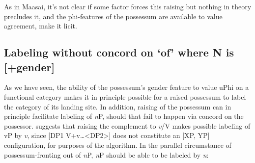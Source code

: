 \documentclass[output=paper
,modfonts
,nonflat]{langsci/langscibook}
\begin{document}
\begin{figure}[!h]
	\begin{exe}
	\end{exe}
\end{figure}
\newpage\noindent As in Maasai, it’s not clear if some factor forces this raising but nothing in theory precludes it, and the phi-features of the possessum are available to value agreement, make it licit.

\subsection{Labeling without concord on ‘of’ where N is [+gender]}
As we have seen, the ability of the possessum’s gender feature to value uPhi on a functional category makes it in principle possible for a raised possessum to label the category of its landing site. In addition, raising of the possessum can in principle facilitate labeling of \textit{n}P, should that fail to happen via concord on the possessor. \citet[44]{Chomsky2013} suggests that raising the complement to \textit{v}/V makes possible labeling of vP by \textit{v}, since [DP1 V+v…<DP2>] does not constitute an [XP, YP] configuration, for purposes of the algorithm. In the parallel circumstance of possessum-fronting out of \textit{n}P, \textit{n}P should be able to be labeled by \textit{n}:
\end{document}
